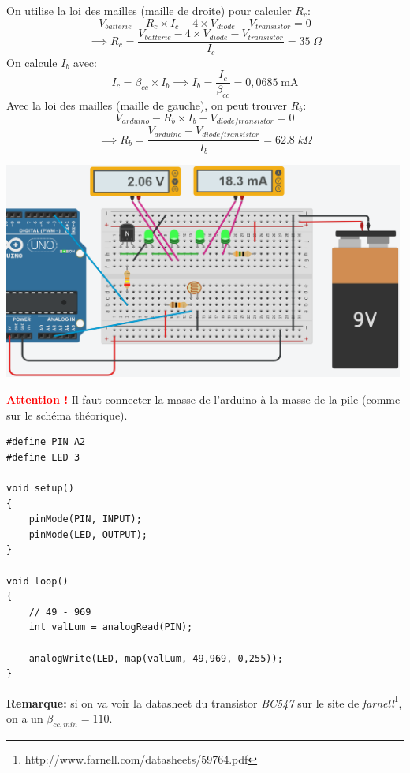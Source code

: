 \documentclass[a4paper]{article}
\begin{document}
On utilise la loi des mailles (maille de droite) pour calculer $ R_c $:
\[ V_{batterie} - R_c \times I_c - 4 \times V_{diode} - V_{transistor} = 0 \]
\[
    \implies R_c
    = \frac{V_{batterie} - 4 \times V_{diode} - V_{transistor}}{I_c}
    = 35 \; \Omega
\]
On calcule $ I_b $ avec:
\[
    I_c = \beta_{cc} \times I_b
    \implies I_b
    = \frac{I_c}{\beta_{cc}}
    = 0,0685 \; \text{mA}
\]
Avec la loi des mailles (maille de gauche), on peut trouver $ R_b $:
\[ V_{arduino} - R_b \times I_b - V_{diode/transistor} = 0 \]
\[
    \implies R_b
    = \frac{V_{arduino} - V_{diode/transistor}}{I_b}
    = 62.8 \; k\Omega
\]





\begin{center}
    \includegraphics[width=0.99\textwidth]{images/leds-serie.PNG}
\end{center}
\textcolor{red}{\textbf{Attention !}} Il faut connecter la masse de l'arduino à la masse de la pile (comme sur le schéma théorique).
\begin{lstlisting}[frame=single]
#define PIN A2
#define LED 3

void setup()
{
    pinMode(PIN, INPUT);
    pinMode(LED, OUTPUT);
}

void loop()
{
    // 49 - 969
    int valLum = analogRead(PIN);

    analogWrite(LED, map(valLum, 49,969, 0,255));
}
\end{lstlisting}





\textbf{Remarque:} si on va voir la datasheet du transistor \textit{BC547} sur le site de \textit{farnell}\footnote{http://www.farnell.com/datasheets/59764.pdf}, on a un $ \beta_{cc,min} = 110 $.
\end{document}
